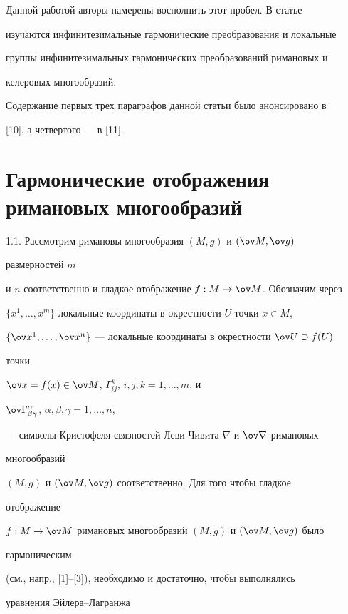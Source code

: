 Данной работой авторы намерены восполнить этот пробел. В статье 


изучаются инфинитезимальные гармонические преобразования и локальные 


группы инфинитезимальных гармонических преобразований римановых и 


келеровых многообразий. 


 


Содержание первых трех параграфов данной статьи было анонсировано в 


[10], а четвертого --- в [11]. 


 


 


\section{Гармонические отображения римановых многообразий} 


 


1.1. Рассмотрим римановы многообразия $(M,g)$ и $(\ov M,\ov g)$ 


размерностей $m$ 


и $n$ соответственно и гладкое отображение $f:M\to\ov M$. Обозначим через 


$\{x^1,\dotsc,x^m\}$ локальные координаты в окрестности $U$ точки $x\in M$, 


$\{\ov x^1,\dotsc,\ov x^n\}$ --- локальные координаты в окрестности $\ov U\supset f(U)$ 


точки 


$\ov x=f(x)\in\ov M$, $\Gamma^k_{ij}$, $i,j,k=1,\dotsc,m$, и 


$\ov\Gamma^\alpha_{\beta\gamma}$, $\alpha,\beta,\gamma=1,\dotsc,n$, 


--- символы Кристофеля связностей Леви-Чивита $\nabla$ и $\ov\nabla$ римановых 


многообразий 


$(M,g)$ и $(\ov M,\ov g)$ соответственно. Для того чтобы гладкое 


отображение 


$f:M\to\ov M$ римановых многообразий $(M,g)$ и $(\ov M,\ov g)$ было {\it 


гармоническим} 


(см., напр., [1]--[3]), необходимо и достаточно, чтобы выполнялись 


уравнения Эйлера--Лагранжа 


